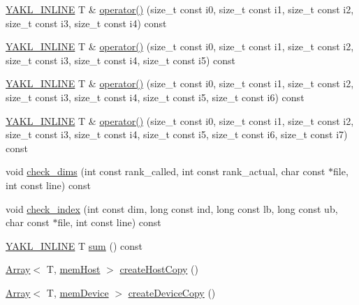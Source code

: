 \begin{DoxyCompactItemize}
\item 
\hyperlink{YAKL_8h_aa0dd629ffce6d564b19e9313fb91a5ad}{Y\+A\+K\+L\+\_\+\+I\+N\+L\+I\+NE} T \& \hyperlink{classyakl_1_1Array_a1910b47b3a87326a51a8859969920a21}{operator()} (size\+\_\+t const i0, size\+\_\+t const i1, size\+\_\+t const i2, size\+\_\+t const i3, size\+\_\+t const i4) const
\item 
\hyperlink{YAKL_8h_aa0dd629ffce6d564b19e9313fb91a5ad}{Y\+A\+K\+L\+\_\+\+I\+N\+L\+I\+NE} T \& \hyperlink{classyakl_1_1Array_a05724663c7b87249c1b8c973c41e4b6c}{operator()} (size\+\_\+t const i0, size\+\_\+t const i1, size\+\_\+t const i2, size\+\_\+t const i3, size\+\_\+t const i4, size\+\_\+t const i5) const
\item 
\hyperlink{YAKL_8h_aa0dd629ffce6d564b19e9313fb91a5ad}{Y\+A\+K\+L\+\_\+\+I\+N\+L\+I\+NE} T \& \hyperlink{classyakl_1_1Array_a8c757674535e63eee86158d0bd4eb252}{operator()} (size\+\_\+t const i0, size\+\_\+t const i1, size\+\_\+t const i2, size\+\_\+t const i3, size\+\_\+t const i4, size\+\_\+t const i5, size\+\_\+t const i6) const
\item 
\hyperlink{YAKL_8h_aa0dd629ffce6d564b19e9313fb91a5ad}{Y\+A\+K\+L\+\_\+\+I\+N\+L\+I\+NE} T \& \hyperlink{classyakl_1_1Array_a7f7d1b0078839867894633a816f6d836}{operator()} (size\+\_\+t const i0, size\+\_\+t const i1, size\+\_\+t const i2, size\+\_\+t const i3, size\+\_\+t const i4, size\+\_\+t const i5, size\+\_\+t const i6, size\+\_\+t const i7) const
\item 
void \hyperlink{classyakl_1_1Array_ae3887c68b1d1546fcb97a39d66f0dc48}{check\+\_\+dims} (int const rank\+\_\+called, int const rank\+\_\+actual, char const $\ast$file, int const line) const
\item 
void \hyperlink{classyakl_1_1Array_a24b13664d65c0c4f9a111c0897bd2f4d}{check\+\_\+index} (int const dim, long const ind, long const lb, long const ub, char const $\ast$file, int const line) const
\item 
\hyperlink{YAKL_8h_aa0dd629ffce6d564b19e9313fb91a5ad}{Y\+A\+K\+L\+\_\+\+I\+N\+L\+I\+NE} T \hyperlink{classyakl_1_1Array_afe99f24bf88f807863b0c1c26c5957e4}{sum} () const
\item 
\hyperlink{classyakl_1_1Array}{Array}$<$ T, \hyperlink{namespaceyakl_aae8a8c910fec7cef7db68c9658c16405}{mem\+Host} $>$ \hyperlink{classyakl_1_1Array_a1f97f8b19063220b5a129ee8c90eccac}{create\+Host\+Copy} ()
\item 
\hyperlink{classyakl_1_1Array}{Array}$<$ T, \hyperlink{namespaceyakl_ac3c32aec58c61e7f870081477ceee883}{mem\+Device} $>$ \hyperlink{classyakl_1_1Array_ace2cf939f0d0675c66b3a15429dc2d4c}{create\+Device\+Copy} ()

\end{DoxyCompactItemize}
